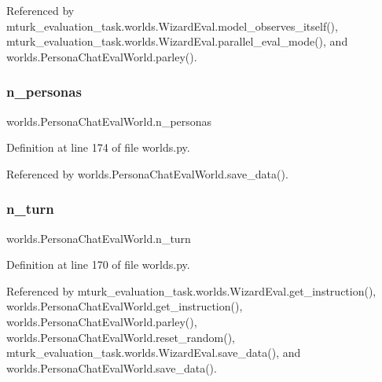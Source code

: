 Referenced by mturk\+\_\+evaluation\+\_\+task.\+worlds.\+Wizard\+Eval.\+model\+\_\+observes\+\_\+itself(), mturk\+\_\+evaluation\+\_\+task.\+worlds.\+Wizard\+Eval.\+parallel\+\_\+eval\+\_\+mode(), and worlds.\+Persona\+Chat\+Eval\+World.\+parley().

\mbox{\label{classworlds_1_1PersonaChatEvalWorld_a459152c14865510575d033179a785954}} 
\subsubsection{\texorpdfstring{n\+\_\+personas}{n\_personas}}
{\footnotesize\ttfamily worlds.\+Persona\+Chat\+Eval\+World.\+n\+\_\+personas}



Definition at line 174 of file worlds.\+py.



Referenced by worlds.\+Persona\+Chat\+Eval\+World.\+save\+\_\+data().

\mbox{\label{classworlds_1_1PersonaChatEvalWorld_aaa99f726cdbcdd81a6bcaa0eaebac726}} 
\subsubsection{\texorpdfstring{n\+\_\+turn}{n\_turn}}
{\footnotesize\ttfamily worlds.\+Persona\+Chat\+Eval\+World.\+n\+\_\+turn}



Definition at line 170 of file worlds.\+py.



Referenced by mturk\+\_\+evaluation\+\_\+task.\+worlds.\+Wizard\+Eval.\+get\+\_\+instruction(), worlds.\+Persona\+Chat\+Eval\+World.\+get\+\_\+instruction(), worlds.\+Persona\+Chat\+Eval\+World.\+parley(), worlds.\+Persona\+Chat\+Eval\+World.\+reset\+\_\+random(), mturk\+\_\+evaluation\+\_\+task.\+worlds.\+Wizard\+Eval.\+save\+\_\+data(), and worlds.\+Persona\+Chat\+Eval\+World.\+save\+\_\+data().

